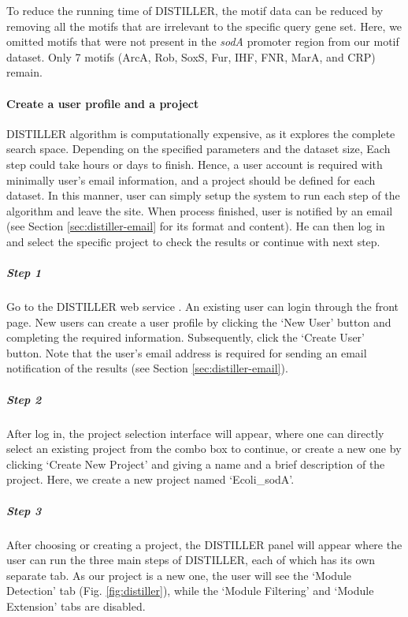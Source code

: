 To reduce the running time of DISTILLER, the motif data can be reduced by 
removing all the motifs that are irrelevant to the specific query gene set.  
Here, we omitted motifs that were not present in the \textit{sodA} promoter 
region from our motif dataset. Only 7 motifs (ArcA, Rob, SoxS, Fur, IHF, 
FNR, MarA, and CRP) remain.


\paragraph{Create a user profile and a project}
DISTILLER algorithm is computationally expensive, as it explores the complete 
search space. Depending on the specified parameters and the dataset size, Each 
step could take hours or days to finish.  Hence, a user account is required 
with minimally user's email information, and a project should be defined for 
each dataset.  In this manner, user can simply setup the system to run each 
step of the algorithm and leave the site.  
When process finished, user is notified by an email (see Section 
\ref{sec:distiller-email} for its format and content).
He can then log in and select the specific project to check the results or 
continue with next step.


\vspace{-5mm}\begin{adjustwidth}{3mm}{0cm}
\nointerlineskip\leavevmode
\subparagraph{Step 1}	Go to the DISTILLER web service \cite{DISTILLER}. An 
existing user can login through the front page. 
New users can create a user profile by clicking the `New User' 
button and completing the required information. Subsequently, click the `Create 
User' button. Note that the user's email address is required for sending an 
email notification of the results (see Section \ref{sec:distiller-email}).

\subparagraph{Step 2}	After log in, the project selection interface will 
appear, where one can directly select an existing project from the combo box to 
continue, or create a new one by clicking `Create New Project' and giving a 
name and a brief description of the project. Here, we create a new project 
named `Ecoli\_sodA'.

\subparagraph{Step 3}	After choosing or creating a project, the DISTILLER 
panel will appear where the user can run the three main steps of DISTILLER, 
each of which has its own separate tab. As our project is a new one, the user 
will see the `Module Detection' tab (Fig. \ref{fig:distiller}), while the 
`Module Filtering' and `Module Extension' tabs are disabled.
\end{adjustwidth}


